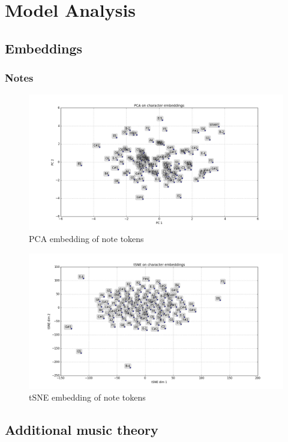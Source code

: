 \documentclass[dissertation.tex]{subfiles}
\begin{document}
\chapter{Model Analysis}

\section{Embeddings}

\subsection{Notes}

\begin{figure}[htpb]
    \centering
    \includegraphics[width=0.8\linewidth]{Figures/PCA-notes.png}
    \caption{PCA embedding of note tokens}
    \label{fig:pca-notes}
\end{figure}

\begin{figure}[htpb]
    \centering
    \includegraphics[width=0.8\linewidth]{Figures/tSNE-notes.png}
    \caption{tSNE embedding of note tokens}
    \label{fig:tsne-notes}
\end{figure}

\section{Additional music theory}
\end{document}
